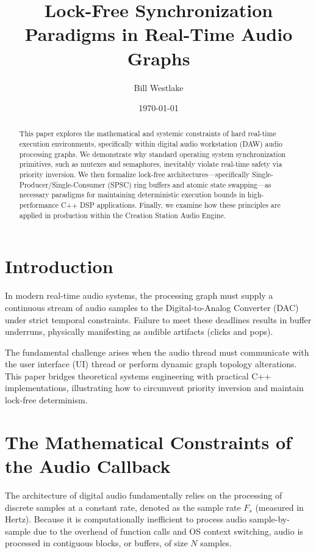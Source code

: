 \documentclass[11pt,a4paper]{article}
\title{Lock-Free Synchronization Paradigms in Real-Time Audio Graphs}
\author{Bill Westlake}
\date{\today}
\begin{document}
\maketitle

\begin{abstract}
This paper explores the mathematical and systemic constraints of hard real-time execution environments, specifically within digital audio workstation (DAW) audio processing graphs. We demonstrate why standard operating system synchronization primitives, such as mutexes and semaphores, inevitably violate real-time safety via priority inversion. We then formalize lock-free architectures---specifically Single-Producer/Single-Consumer (SPSC) ring buffers and atomic state swapping---as necessary paradigms for maintaining deterministic execution bounds in high-performance C++ DSP applications. Finally, we examine how these principles are applied in production within the Creation Station Audio Engine.
\end{abstract}

\section{Introduction}
In modern real-time audio systems, the processing graph must supply a continuous stream of audio samples to the Digital-to-Analog Converter (DAC) under strict temporal constraints. Failure to meet these deadlines results in buffer underruns, physically manifesting as audible artifacts (clicks and pops). 

The fundamental challenge arises when the audio thread must communicate with the user interface (UI) thread or perform dynamic graph topology alterations. This paper bridges theoretical systems engineering with practical C++ implementations, illustrating how to circumvent priority inversion and maintain lock-free determinism.

\section{The Mathematical Constraints of the Audio Callback}
The architecture of digital audio fundamentally relies on the processing of discrete samples at a constant rate, denoted as the sample rate $F_s$ (measured in Hertz). Because it is computationally inefficient to process audio sample-by-sample due to the overhead of function calls and OS context switching, audio is processed in contiguous blocks, or buffers, of size $N$ samples.
\end{document}
